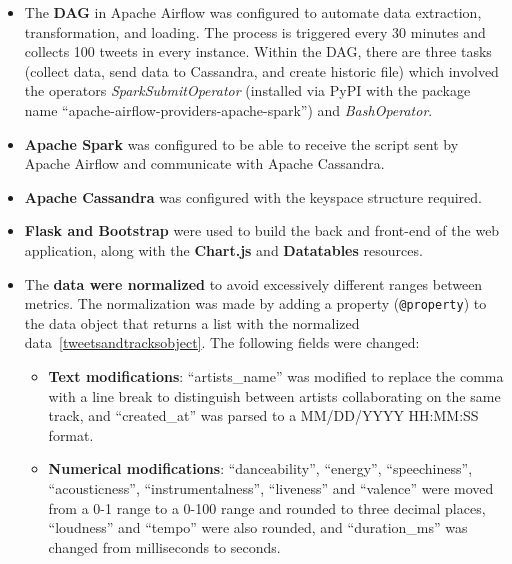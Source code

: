 \begin{itemize}
	\item The \textbf{DAG} in Apache Airflow was configured to automate data extraction, transformation, and loading. The process is triggered every 30 minutes and collects 100 tweets in every instance. Within the DAG, there are three tasks (collect data, send data to Cassandra, and create historic file) which involved the operators \textit{SparkSubmitOperator} (installed via PyPI with the package name ``apache-airflow-providers-apache-spark'') and \textit{BashOperator}.
	\item \textbf{Apache Spark} was configured to be able to receive the script sent by Apache Airflow and communicate with Apache Cassandra.
	\item \textbf{Apache Cassandra} was configured with the keyspace structure required.
	\item \textbf{Flask and Bootstrap} were used to build the back and front-end of the web application, along with the \textbf{Chart.js} and \textbf{Datatables} resources.
	\item The \textbf{data were normalized} to avoid excessively different ranges between metrics. The normalization was made by adding a property (\texttt{@property}) to the data object that returns a list with the normalized data~\ref{tweetsandtracksobject}. The following fields were changed:
	\begin{itemize}
		\item \textbf{Text modifications}: ``artists\_name'' was modified to replace the comma with a line break to distinguish between artists collaborating on the same track, and ``created\_at'' was parsed to a MM/DD/YYYY HH:MM:SS format.
		\item \textbf{Numerical modifications}: ``danceability'', ``energy'', ``speechiness'', ``acousticness'', ``instrumentalness'', ``liveness'' and ``valence'' were moved from a 0-1 range to a 0-100 range and rounded to three decimal places, ``loudness'' and ``tempo'' were also rounded, and ``duration\_ms'' was changed from milliseconds to seconds.
	\end{itemize}
\end{itemize}


